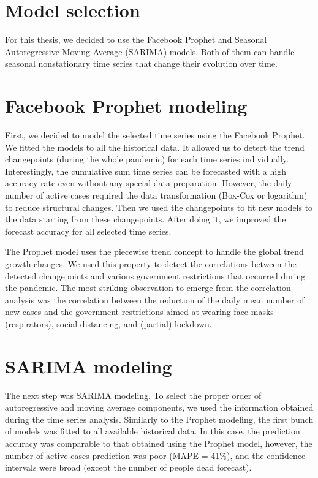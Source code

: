 \section{Model selection}

For this thesis, we decided to use the Facebook Prophet and Seasonal Autoregressive Moving Average (SARIMA) models. Both of them can handle seasonal nonstationary time series that change their evolution over time.

\section{Facebook Prophet modeling}

First, we decided to model the selected time series using the Facebook Prophet. We fitted the models to all the historical data. It allowed us to detect the trend changepoints (during the whole pandemic) for each time series individually. Interestingly, the cumulative sum time series can be forecasted with a high accuracy rate even without any special data preparation. However, the daily number of active cases required the data transformation (Box-Cox or logarithm) to reduce structural changes. Then we used the changepoints to fit new models to the data starting from these changepoints. After doing it, we improved the forecast accuracy for all selected time series. 

The Prophet model uses the piecewise trend concept to handle the global trend growth changes. We used this property to detect the correlations between the detected changepoints and various government restrictions that occurred during the pandemic. The most striking observation to emerge from the correlation analysis was the correlation between the reduction of the daily mean number of new cases and the government restrictions aimed at wearing face masks (respirators), social distancing, and (partial) lockdown.

\section{SARIMA modeling}

The next step was SARIMA modeling. To select the proper order of autoregressive and moving average components, we used the information obtained during the time series analysis. Similarly to the Prophet modeling, the first bunch of models was fitted to all available historical data. In this case, the prediction accuracy was comparable to that obtained using the Prophet model, however, the number of active cases prediction was poor (MAPE = 41\%), and the confidence intervals were broad (except the number of people dead forecast). 


